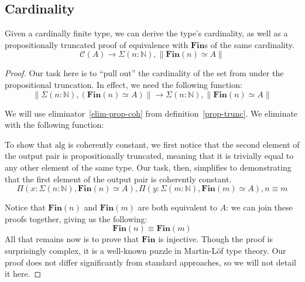 \subsection{Cardinality}
\begin{rm-theorem}
  Given a cardinally finite type, we can derive the type's cardinality, as well
  as a propositionally truncated proof of equivalence with \(\textbf{Fin}\)s of
  the same cardinality.
  \begin{equation}
    \mathcal{C}(A) \rightarrow \Sigma {(n : \mathbb{N})} , \lVert \textbf{Fin}(n) \simeq A \rVert
  \end{equation}
\end{rm-theorem}
\begin{proof}
  Our task here is to ``pull out'' the cardinality of the set from under the
  propositional truncation.
  In effect, we need the following function:
  \begin{equation}
    \left\lVert \Sigma {(n : \mathbb{N})} , \left( \mathbf{Fin}(n) \simeq A \right) \right\rVert \rightarrow
    \Sigma {(n : \mathbb{N})} , \left\lVert \mathbf{Fin}(n) \simeq A \right\rVert
  \end{equation}

  We will use eliminator~\ref{elim-prop-coh} from definition~\ref{prop-trunc}.
  We eliminate with the following function:

  To show that \(\text{alg}\) is coherently constant, we first notice that the
  second element of the output pair is propositionally truncated, meaning that
  it is trivially equal to any other element of the same type.
  Our task, then, simplifies to demonstrating that the first element of the
  output pair is coherently constant.
  \begin{equation}
    \Pi {(x : \Sigma {(n : \mathbb{N})} , \textbf{Fin}(n) \simeq A)} ,
    \Pi {(y : \Sigma {(m : \mathbb{N})} , \textbf{Fin}(m) \simeq A)} ,
    n \equiv m
  \end{equation}

  Notice that \(\mathbf{Fin}(n)\) and \(\mathbf{Fin}(m)\) are both equivalent to
  \(A\): we can join these proofs together, giving us the following:
  \begin{equation}
    \textbf{Fin}(n) \equiv \textbf{Fin}(m)
  \end{equation}
  All that remains now is to prove that \(\mathbf{Fin}\) is injective.
  Though the proof is surprisingly complex, it is a well-known puzzle in
  Martin-Löf type theory.
  Our proof does not differ significantly from standard approaches, so we will
  not detail it here.
\end{proof}
